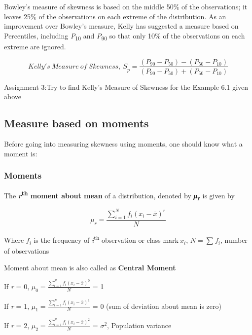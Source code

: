 \documentclass[
]{book}
\makeatletter
\newenvironment{kframe}{%
\medskip{}
\setlength{\fboxsep}{.8em}
 \def\at@end@of@kframe{}%
 \ifinner\ifhmode%
  \def\at@end@of@kframe{\end{minipage}}%
  \begin{minipage}{\columnwidth}%
 \fi\fi%
 \def\FrameCommand##1{\hskip\@totalleftmargin \hskip-\fboxsep
 \colorbox{shadecolor}{##1}\hskip-\fboxsep
     \hskip-\linewidth \hskip-\@totalleftmargin \hskip\columnwidth}%
 \MakeFramed {\advance\hsize-\width
   \@totalleftmargin\z@ \linewidth\hsize
   \@setminipage}}%
 {\par\unskip\endMakeFramed%
 \at@end@of@kframe}
\newenvironment{rmdblock}[1]
  {
  \begin{itemize}
  \renewcommand{\labelitemi}{
    \raisebox{-.7\height}[0pt][0pt]{
      {\setkeys{Gin}{width=3em,keepaspectratio}\texttt{[image: images/\#1]}}
    }
  }
  \setlength{\fboxsep}{1em}
  \begin{kframe}
  \item
  }
  {
  \end{kframe}
  \end{itemize}
  }
\newenvironment{rmdnote}
  {\begin{rmdblock}{note}}
  {\end{rmdblock}}
\makeatother
\begin{document}
Bowley's measure of skewness is based on the middle 50\% of the
observations; it leaves 25\% of the observations on each extreme of the
distribution. As an improvement over Bowley's measure, Kelly has
suggested a measure based on Percentiles, including \emph{P}\textsubscript{10} and \emph{P}\textsubscript{90}
so that only 10\% of the observations on each extreme are ignored.

\[{Kelly's\ Measure\ of\ Skewness,\ S}_{p} = \frac{\left( P_{90} - P_{50} \right) - \left( P_{50} - P_{10} \right)}{\left( P_{90} - P_{50} \right) + \left( P_{50} - P_{10} \right)}\]

\begin{rmdnote}
Assignment 3:Try to find Kelly's Measure of Skewness
for the Example 6.1 given above
\end{rmdnote}

\hypertarget{measure-based-on-moments}{%
\subsection{Measure based on moments}\label{measure-based-on-moments}}

Before going into measuring skewness using moments, one should know what
a moment is:

\hypertarget{moments}{%
\subsubsection{Moments}\label{moments}}

The \textbf{\emph{r}\textsuperscript{th} moment about mean} of a distribution, denoted by
\textbf{\emph{μ}\textsubscript{r}} is given by

\[\mu_{r} = \frac{\sum_{i = 1}^{N}{f_{i}\left( x_{i} - \overline{x} \right)^{r}}}{N}\]

Where \(f_{i}\) is the frequency of \emph{i}\textsuperscript{th} observation or class
mark\(\ x_{i}\), \(N = \sum_{}^{}f_{i}\), number of observations

Moment about mean is also called as \textbf{Central Moment}

If \emph{r} = 0,
\(\mu_{0} = \frac{\sum_{i = 1}^{N}{f_{i}\left( x_{i} - \overline{x} \right)^{0}}}{N}\)
= 1

If \emph{r} = 1,
\(\mu_{1} = \frac{\sum_{i = 1}^{N}{f_{i}\left( x_{i} - \overline{x} \right)^{1}}}{N}\)
= 0 (sum of deviation about mean is zero)

If \emph{r} = 2,
\(\mu_{2} = \frac{\sum_{i = 1}^{N}{f_{i}\left( x_{i} - \overline{x} \right)^{2}}}{N}\)
= \(\sigma^{2}\), Population variance
\end{document}
